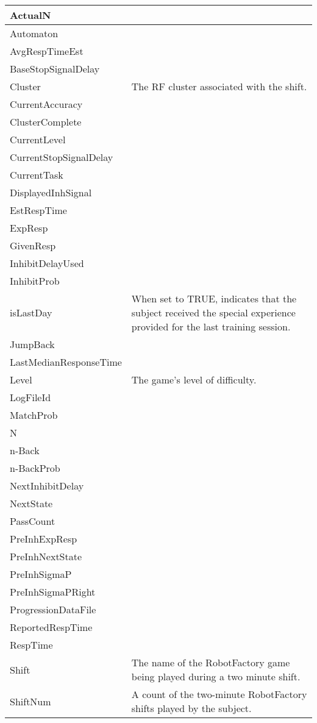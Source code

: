 \documentclass[letterpaper,10pt,english]{sphinxmanual}
\begin{document}
\begin{savenotes}
\begin{longtable}{|l|l|}
ActualN
&\\
\hline
Automaton
&\\
\hline
AvgRespTimeEst
&\\
\hline
BaseStopSignalDelay
&\\
\hline
Cluster
&
The RF cluster associated with the shift.
\\
\hline
CurrentAccuracy
&\\
\hline
ClusterComplete
&\\
\hline
CurrentLevel
&\\
\hline
CurrentStopSignalDelay
&\\
\hline
CurrentTask
&\\
\hline
DisplayedInhSignal
&\\
\hline
EstRespTime
&\\
\hline
ExpResp
&\\
\hline
GivenResp
&\\
\hline
InhibitDelayUsed
&\\
\hline
InhibitProb
&\\
\hline
isLastDay
&
When set to TRUE, indicates that the subject received the special experience provided for the last training session.
\\
\hline
JumpBack
&\\
\hline
LastMedianResponseTime
&\\
\hline
Level
&
The game’s level of difficulty.
\\
\hline
LogFileId
&\\
\hline
MatchProb
&\\
\hline
N
&\\
\hline
n-Back
&\\
\hline
n-BackProb
&\\
\hline
NextInhibitDelay
&\\
\hline
NextState
&\\
\hline
PassCount
&\\
\hline
PreInhExpResp
&\\
\hline
PreInhNextState
&\\
\hline
PreInhSigmaP
&\\
\hline
PreInhSigmaPRight
&\\
\hline
ProgressionDataFile
&\\
\hline
ReportedRespTime
&\\
\hline
RespTime
&\\
\hline
Shift
&
The name of the RobotFactory game being played during a two minute shift.
\\
\hline
ShiftNum
&
A count of the two-minute RobotFactory shifts played by the subject.

\end{longtable}
\end{savenotes}
\end{document}

